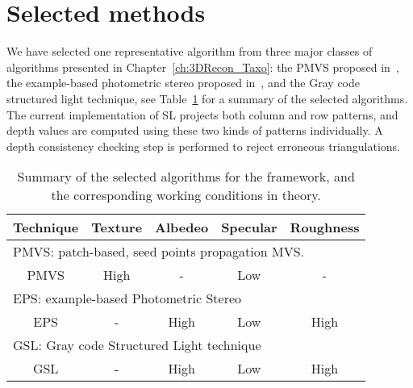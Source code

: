 \section{Selected methods}
We have selected one representative algorithm from three major classes of algorithms presented in Chapter~\ref{ch:3DRecon_Taxo}: the PMVS proposed in~\cite{furukawa2010accurate}, the example-based photometric stereo proposed in~\cite{hertzmann2005example}, and the Gray code structured light technique, see Table~\ref{tab:selected_algos} for a summary of the selected algorithms. The current implementation of SL projects both column and row patterns, and depth values are computed using these two kinds of patterns individually. A depth consistency checking step is performed to reject erroneous triangulations.
\begin{table}[!htbp]
\centering
\begin{tabular}{c|c|c|c|c}
\hline
Technique & Texture & Albedeo & Specular & Roughness\\
\hline\hline
\multicolumn{5}{l}{PMVS: patch-based, seed points propagation MVS.}\\
\hline
PMVS & High & - & Low & -\\
\hline\hline
\multicolumn{5}{l}{EPS: example-based Photometric Stereo}\\
\hline
EPS & - & High & Low & High \\
\hline\hline
\multicolumn{5}{l}{GSL: Gray code Structured Light technique}\\
\hline
GSL & - & High & Low & High\\
\hline
\end{tabular}
\caption{Summary of the selected algorithms for the framework, and the corresponding working conditions in theory.}
\label{tab:selected_algos}
\end{table}


